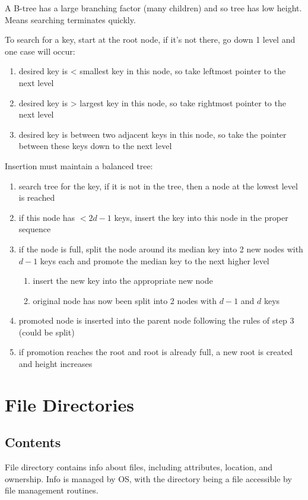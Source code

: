 \documentclass[11pt]{article}
\begin{document}
A B-tree has a large branching factor (many children) and so tree has low height.
Means searching terminates quickly.

To search for a key, start at the root node, if it's not there, go down 1 level and one case will occur:
\begin{enumerate}
\item desired key is < smallest key in this node, so take leftmost pointer to the next level
\item desired key is > largest key in this node, so take rightmost pointer to the next level
\item desired key is between two adjacent keys in this node, so take the pointer between these keys
down to the next level
\end{enumerate}

Insertion must maintain a balanced tree:
\begin{enumerate}
\item search tree for the key, if it is not in the tree, then a node at the lowest level is reached
\item if this node has \(< 2d-1\) keys, insert the key into this node in the proper sequence
\item if the node is full, split the node around its median key into 2 new nodes with \(d-1\) keys each
and promote the median key to the next higher level
\begin{enumerate}
\item insert the new key into the appropriate new node
\item original node has now been split into 2 nodes with \(d-1\) and \(d\) keys
\end{enumerate}
\item promoted node is inserted into the parent node following the rules of step 3 (could be split)
\item if promotion reaches the root and root is already full, a new root is created and height increases
\end{enumerate}
\section{File Directories}
\label{sec:org6d1d06e}
\subsection{Contents}
\label{sec:orga3e750a}
File directory contains info about files, including attributes, location, and ownership.
Info is managed by OS, with the directory being a file accessible by file management routines.
\end{document}
